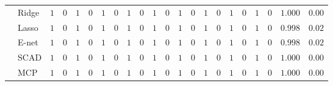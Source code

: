 \begin{tabular}{llllllllllllllllllllll}
	& Ridge  & $1$ & $0$ & $1$ & $0$ & $1$ & $0$ & $1$ & $0$ & $1$ & $0$ & $1$ & $0$ & $1$ & $0$ & $1$ & $0$ & $1$ & $0$ & $1.000$ & $0.00$ \\
	& Lasso  & $1$ & $0$ & $1$ & $0$ & $1$ & $0$ & $1$ & $0$ & $1$ & $0$ & $1$ & $0$ & $1$ & $0$ & $1$ & $0$ & $1$ & $0$ & $0.998$ & $0.02$ \\
	& E-net  & $1$ & $0$ & $1$ & $0$ & $1$ & $0$ & $1$ & $0$ & $1$ & $0$ & $1$ & $0$ & $1$ & $0$ & $1$ & $0$ & $1$ & $0$ & $0.998$ & $0.02$ \\
	& SCAD  & $1$ & $0$ & $1$ & $0$ & $1$ & $0$ & $1$ & $0$ & $1$ & $0$ & $1$ & $0$ & $1$ & $0$ & $1$ & $0$ & $1$ & $0$ & $1.000$ & $0.00$ \\
	& MCP  & $1$ & $0$ & $1$ & $0$ & $1$ & $0$ & $1$ & $0$ & $1$ & $0$ & $1$ & $0$ & $1$ & $0$ & $1$ & $0$ & $1$ & $0$ & $1.000$ & $0.00$ \\
	\hline 
\end{tabular}